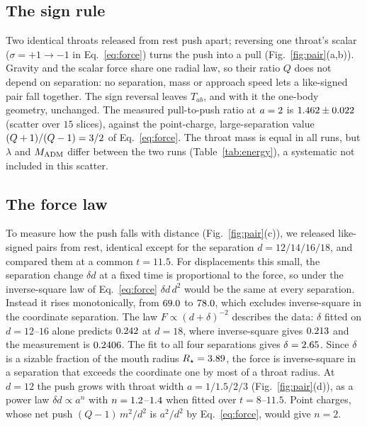\documentclass[twocolumn,floatfix,aps,prd,superscriptaddress,nofootinbib,showkeys]{revtex4-2}
\begin{document}
\subsection{The sign rule}
\label{sec:pair:sign}

Two identical throats released from rest push apart; reversing one throat's scalar ($\sigma=+1\to-1$ in Eq.~\eqref{eq:force}) turns the push into a pull (Fig.~\ref{fig:pair}(a,b)). Gravity and the scalar force share one radial law, so their ratio $Q$ does not depend on separation: no separation, mass or approach speed lets a like-signed pair fall together. The sign reversal leaves $T_{ab}$, and with it the one-body geometry, unchanged. The measured pull-to-push ratio at $a=2$ is $1.462\pm0.022$ (scatter over $15$ slices), against the point-charge, large-separation value $(Q+1)/(Q-1)=3/2$ of Eq.~\eqref{eq:force}. The throat mass is equal in all runs, but $\lambda$ and $M_{\rm ADM}$ differ between the two runs (Table~\ref{tab:energy}), a systematic not included in this scatter.

\subsection{The force law}
\label{sec:pair:force}

To measure how the push falls with distance (Fig.~\ref{fig:pair}(c)), we released \clmCountLikeSignedPairs{} like-signed pairs from rest, identical except for the separation $d=12/14/16/18$, and compared them at a common $t=11.5$. For displacements this small, the separation change $\delta d$ at a fixed time is proportional to the force, so under the inverse-square law of Eq.~\eqref{eq:force} $\delta d\,d^2$ would be the same at every separation. Instead it rises monotonically, from $69.0$ to $78.0$, which excludes inverse-square in the coordinate separation. The law $F\propto(d+\delta)^{-2}$ describes the data: $\delta$ fitted on $d=12$--$16$ alone predicts $0.242$ at $d=18$, where inverse-square gives $0.213$ and the measurement is $0.2406$. The fit to all four separations gives $\delta=2.65$. Since $\delta$ is a sizable fraction of the mouth radius $R_\star=3.89$, the force is inverse-square in a separation that exceeds the coordinate one by most of a throat radius. At $d=12$ the push grows with throat width $a=1/1.5/2/3$ (Fig.~\ref{fig:pair}(d)), as a power law $\delta d\propto a^n$ with $n=1.2$--$1.4$ when fitted over $t=8$--$11.5$. Point charges, whose net push $(Q-1)\,m^2/d^2$ is $a^2/d^2$ by Eq.~\eqref{eq:force}, would give $n=2$.
\end{document}
